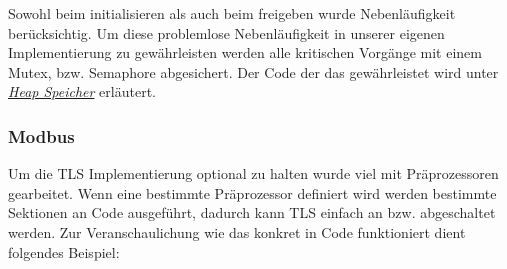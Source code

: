 \documentclass[letterpaper,10pt,ngerman]{sphinxmanual}
\begin{document}
\begin{sphinxVerbatim}[commandchars=\\\{\}]
    
        
        
    \PYG{p}{[}\PYG{p}{]}  
       
      

      
\end{sphinxVerbatim}

Sowohl beim initialisieren als auch beim freigeben wurde Nebenläufigkeit berücksichtig. Um diese problemlose Nebenläufigkeit in unserer eigenen Implementierung zu gewährleisten werden alle kritischen Vorgänge mit einem Mutex, bzw. Semaphore abgesichert. Der Code der das gewährleistet wird unter {\hyperref[\detokenize{seccom:heap-speicher}]{\emph{Heap Speicher}}} erläutert.


\subsubsection{Modbus}
\label{\detokenize{seccom:modbus}}
Um die TLS Implementierung optional zu halten wurde viel mit Präprozessoren gearbeitet. Wenn eine bestimmte Präprozessor definiert wird werden bestimmte Sektionen an Code ausgeführt, dadurch kann TLS einfach an\sphinxhyphen{} bzw. abgeschaltet werden. Zur Veranschaulichung wie das konkret in Code funktioniert dient folgendes Beispiel:

\begin{sphinxVerbatim}[commandchars=\\\{\}]
\end{sphinxVerbatim}
\end{document}
